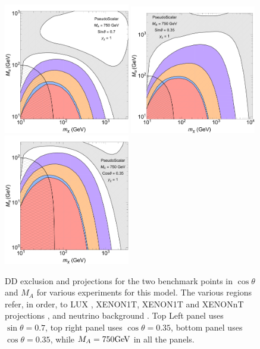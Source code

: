 \begin{figure}[ht]
\begin{center}
\includegraphics[width=0.49\textwidth]{texinputs/06_comparisons/figures/PS_F_S070.pdf}
\includegraphics[width=0.49\textwidth]{texinputs/06_comparisons/figures/PS_F_S035.pdf}\\
\includegraphics[width=0.49\textwidth]{texinputs/06_comparisons/figures/PS_F_C035.pdf}
\caption{DD exclusion and projections for the two benchmark points in $\cos\theta$ and $M_A$ for various experiments for this model. The various regions refer, in order, to LUX \citep{Akerib:2016vxi}, XENON1T\citep{Aprile:2017iyp}, XENON1T and XENONnT projections \citep{Aprile:2015uzo}, and neutrino background \citep{Billard:2013qya}. Top Left panel uses $\sin\theta=0.7$, top right panel uses $\cos\theta=0.35$, bottom panel uses $\cos\theta=0.35$, while $M_A=750\textrm{GeV}$ in all the panels.} 
\label{fig:PSDD2}
\end{center}
\end{figure} 

